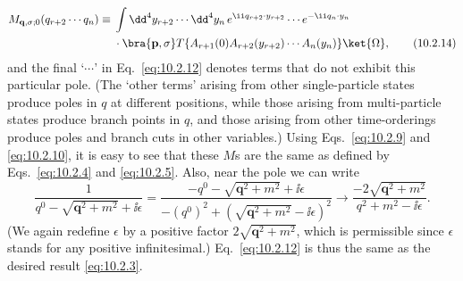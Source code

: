 \begin{align}
  M_{\mathbf q,\sigma;0}(q_{r+2}\cdots q_n)
  \equiv{}&\int \dd^4y_{r+2}\cdots \dd^4y_n\,
  e^{\ii q_{r+2}\cdot y_{r+2}}\cdots e^{-\ii q_n\cdot y_n}
  \notag\\
  &\cdot\bra{\mathbf p,\sigma}T\{A_{r+1}(0)A_{r+2}(y_{r+2})\cdots A_n(y_n)\}\ket{\Omega},
  \tag{10.2.14}\label{eq:10.2.14}
\end{align}
and the final `$\cdots$' in Eq.~\eqref{eq:10.2.12} denotes terms that do not exhibit this
particular pole. (The `other terms' arising from other single-particle states
produce poles in $q$ at different positions, while those arising from multi-particle
states produce branch points in $q$, and those arising from other
time-orderings produce poles and branch cuts in other variables.) Using
Eqs.~\eqref{eq:10.2.9} and \eqref{eq:10.2.10}, it is easy to see that these $M$s are the same as
defined by Eqs.~\eqref{eq:10.2.4} and \eqref{eq:10.2.5}. Also, near the pole we can write
\[
  \frac{1}{q^0-\sqrt{\mathbf q^2+m^2}+\ii\epsilon}
  =\frac{-q^0-\sqrt{\mathbf q^2+m^2}+\ii\epsilon}
  {-(q^0)^2+(\sqrt{\mathbf q^2+m^2}-\ii\epsilon)^2}
  \longrightarrow\frac{-2\sqrt{\mathbf q^2+m^2}}{q^2+m^2-\ii\epsilon}.
\]
(We again redefine $\epsilon$ by a positive factor $2\sqrt{\mathbf q^2+m^2}$, which is permissible
since $\epsilon$ stands for any positive infinitesimal.) Eq.~\eqref{eq:10.2.12} is thus the same
as the desired result \eqref{eq:10.2.3}.

